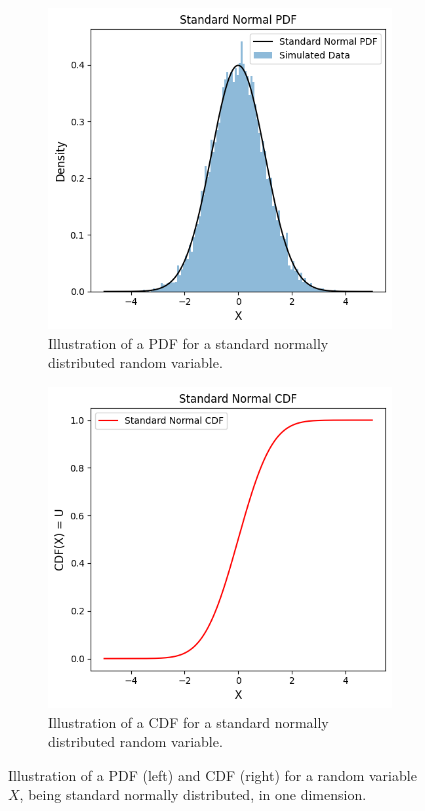 \begin{figure}[h]
    \centering
    \begin{subfigure}[t]{0.45\linewidth}
        \centering
        \includegraphics[width=\linewidth]{3Theory/pictures/PDFIllustrated.png}
        \caption{Illustration of a \gls{PDF} for a standard normally distributed random variable.}
        \label{fig:PDF1d}
    \end{subfigure}
    \hfill
    \begin{subfigure}[t]{0.45\linewidth}
        \centering
        \includegraphics[width=\linewidth]{3Theory/pictures/CDFIllustrated.png}
        \caption{Illustration of a \gls{CDF} for a standard normally distributed random variable.}
        \label{fig:CDF1d}
    \end{subfigure}
    \caption{Illustration of a \gls{PDF} (left) and \gls{CDF} (right) for a random variable $X$, being standard normally distributed, in one dimension.}
    \label{fig:PDFandCDF1D}
\end{figure}


